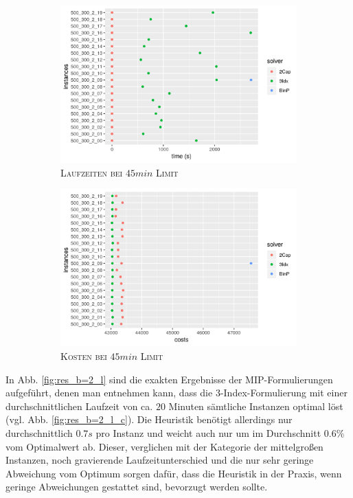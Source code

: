 \begin{figure}[H]
\centering
\begin{subfigure}[b]{0.4\textwidth}
\centering
\includegraphics[width=1.3\textwidth]{img/solver_instance_time_b=2_l_2700s.png}
\caption{\textsc{Laufzeiten bei $45min$ Limit}}
\label{fig:b=2_l_runtimes}
\end{subfigure}
\hfill
\begin{subfigure}[b]{0.4\textwidth}
\centering
\includegraphics[width=1.3\textwidth]{img/solver_instance_cost_b=2_l_2700s.png}
\caption{\textsc{Kosten bei $45min$ Limit}}
\label{fig:b=2_l_costs}
\end{subfigure}
\caption{}
\label{fig:res_plots_b=2_l}
\end{figure}

In Abb. \ref{fig:res_b=2_l} sind die exakten Ergebnisse der MIP-Formulierungen aufgeführt, denen man
entnehmen kann, dass die 3-Index-Formulierung mit einer durchschnittlichen Laufzeit von ca. $20$ Minuten sämtliche Instanzen
optimal löst (vgl. Abb. \ref{fig:res_b=2_l_c}). Die Heuristik benötigt allerdings nur durchschnittlich $0.7s$ pro Instanz und
weicht auch nur um im Durchschnitt $0.6 \%$ vom Optimalwert ab. Dieser, verglichen mit der Kategorie der mittelgroßen Instanzen,
noch gravierende Laufzeitunterschied und die nur sehr geringe Abweichung vom Optimum sorgen dafür, dass die Heuristik in der Praxis,
wenn geringe Abweichungen gestattet sind, bevorzugt werden sollte.


